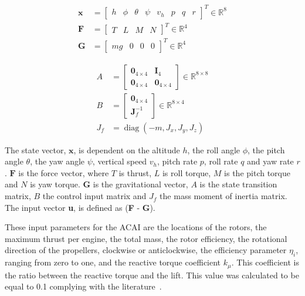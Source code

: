 \noindent
\begin{minipage}[t]{0.45\textwidth}
\begin{align*}
\mathbf{x} &= \begin{bmatrix} h & \phi & \theta & \psi & v_h & p & q & r \end{bmatrix}^T \in \mathbb{R}^8 \\
\mathbf{F} &= \begin{bmatrix} T & L & M & N \end{bmatrix}^T \in \mathbb{R}^4 \\
\mathbf{G} &= \begin{bmatrix} m g & 0 & 0 & 0 \end{bmatrix}^T \in \mathbb{R}^4
\end{align*}
\end{minipage}
\hfill
\begin{minipage}[t]{0.45\textwidth}
\begin{align*}
{A} &= \begin{bmatrix} \mathbf{0}_{4 \times 4} & \mathbf{I}_4 \\ \mathbf{0}_{4 \times 4} & \mathbf{0}_{4 \times 4} \end{bmatrix} \in \mathbb{R}^{8 \times 8} \\
{B} &= \begin{bmatrix} \mathbf{0}_{4 \times 4} \\ \mathbf{J}_f^{-1} \end{bmatrix} \in \mathbb{R}^{8 \times 4} \\
{J}_f &= \operatorname{diag}\left(-m, J_x, J_y, J_z\right)
\end{align*}
\end{minipage}

The state vector, $\textbf{x}$, is dependent on the altitude $h$, the roll angle $\phi$, the pitch angle $\theta$,
the yaw angle $\psi$, vertical speed $v_h$, pitch rate $p$, roll rate $q$ and yaw rate $r$.
$\textbf{F}$ is the force vector, where $T$ is thrust, $L$ is roll torque, $M$ is the pitch torque and $N$ is yaw torque.
$\textbf{G}$ is the gravitational vector, $A$ is the state transition matrix, $B$ the control input matrix and $J_{f}$ the mass moment of inertia matrix. The input vector \textbf{u}, is defined as (\textbf{F} - \textbf{G}).

These input parameters for the ACAI are the locations of the rotors, the maximum thrust per engine, the total mass,
the rotor efficiency, the rotational direction of the propellers,
clockwise or anticlockwise, the efficiency parameter $\eta_{i}$,
ranging from zero to one, and the reactive torque coefficient $k_{\mu}$.
This coefficient is the ratio between the reactive torque and the lift.
This value was calculated to be equal to 0.1 complying with the literature~\cite{du2015controllability}.

